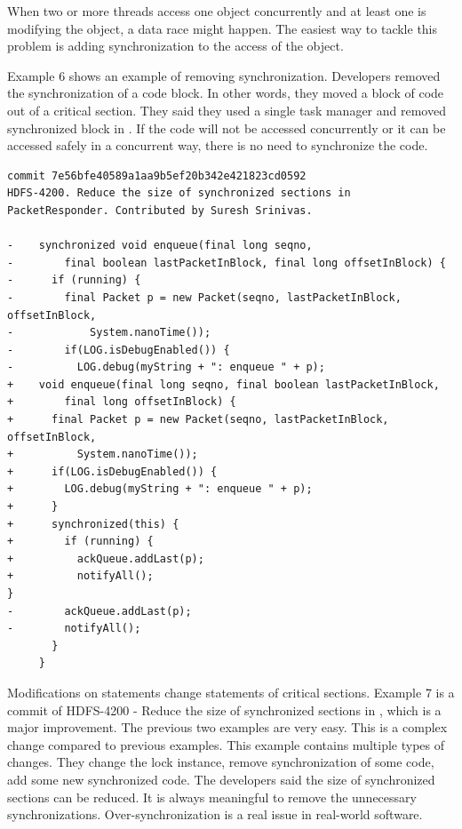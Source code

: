 When two or more threads access one object concurrently and at least one is modifying the object, a data race might happen. The easiest way to tackle this problem is adding synchronization to the access of the object.

Example 6 shows an example of removing synchronization. Developers removed the synchronization of a code block. In other words, they moved a block of code out of a critical section. They said they used a single task manager and removed synchronized block in . If the code will not be accessed concurrently or it can be accessed safely in a concurrent way, there is no need to synchronize the code.



\begin{lstlisting}
commit 7e56bfe40589a1aa9b5ef20b342e421823cd0592
HDFS-4200. Reduce the size of synchronized sections in PacketResponder. Contributed by Suresh Srinivas.

-    synchronized void enqueue(final long seqno,
-        final boolean lastPacketInBlock, final long offsetInBlock) {
-      if (running) {
-        final Packet p = new Packet(seqno, lastPacketInBlock, offsetInBlock,
-            System.nanoTime());
-        if(LOG.isDebugEnabled()) {
-          LOG.debug(myString + ": enqueue " + p);
+    void enqueue(final long seqno, final boolean lastPacketInBlock,
+        final long offsetInBlock) {
+      final Packet p = new Packet(seqno, lastPacketInBlock, offsetInBlock,
+          System.nanoTime());
+      if(LOG.isDebugEnabled()) {
+        LOG.debug(myString + ": enqueue " + p);
+      }
+      synchronized(this) {
+        if (running) {
+          ackQueue.addLast(p);
+          notifyAll();
}
-        ackQueue.addLast(p);
-        notifyAll();
       }
     }
\end{lstlisting}

Modifications on statements change statements of critical sections. Example 7 is a commit of HDFS-4200 - Reduce the size of synchronized sections in , which is a major improvement. The previous two examples are very easy. This is a complex change compared to previous examples. This example contains multiple types of changes. They change the lock instance, remove synchronization of some code, add some new synchronized code. The developers said the size of synchronized sections can be reduced. It is always meaningful to remove the unnecessary synchronizations. Over-synchronization \cite{conf/sigsoft/GuJSZL15} is a real issue in real-world software.

